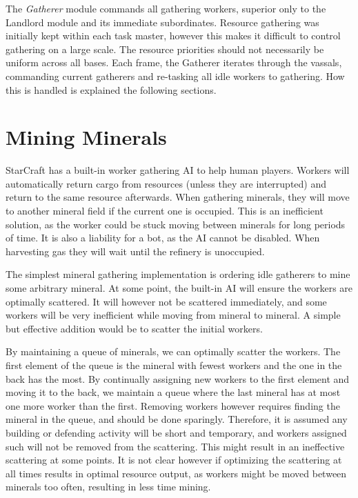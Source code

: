 The \emph{Gatherer} module commands all gathering workers, superior only to the Landlord module and its immediate subordinates. Resource gathering was initially kept within each task master, however this makes it difficult to control gathering on a large scale. The resource priorities should not necessarily be uniform across all bases. Each frame, the Gatherer iterates through the vassals, commanding current gatherers and re-tasking all idle workers to gathering. How this is handled is explained the following sections.

\section{Mining Minerals}
StarCraft has a built-in worker gathering AI to help human players. Workers will automatically return cargo from resources (unless they are interrupted) and return to the same resource afterwards. When gathering minerals, they will move to another mineral field if the current one is occupied. This is an inefficient solution, as the worker could be stuck moving between minerals for long periods of time. It is also a liability for a bot, as the AI cannot be disabled. When harvesting gas they will wait until the refinery is unoccupied.

The simplest mineral gathering implementation is ordering idle gatherers to mine some arbitrary mineral. At some point, the built-in AI will ensure the workers are optimally scattered. It will however not be scattered immediately, and some workers will be very inefficient while moving from mineral to mineral. A simple but effective addition would be to scatter the initial workers.

By maintaining a queue of minerals, we can optimally scatter the workers. The first element of the queue is the mineral with fewest workers and the one in the back has the most. By continually assigning new workers to the first element and moving it to the back, we maintain a queue where the last mineral has at most one more worker than the first. Removing workers however requires finding the mineral in the queue, and should be done sparingly. Therefore, it is assumed any building or defending activity will be short and temporary, and workers assigned such will not be removed from the scattering. This might result in an ineffective scattering at some points. It is not clear however if optimizing the scattering at all times results in optimal resource output, as workers might be moved between minerals too often, resulting in less time mining.

